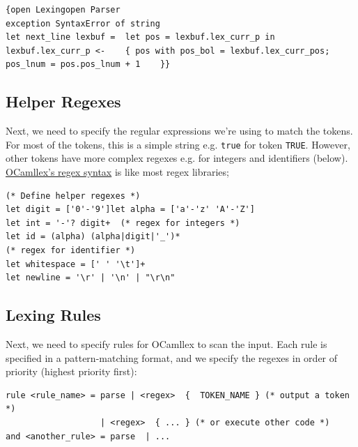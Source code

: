 \begin{lstlisting}[language=caml,caption={{lexer.mll}}]
{open Lexingopen Parser
exception SyntaxError of string
let next_line lexbuf =  let pos = lexbuf.lex_curr_p in  lexbuf.lex_curr_p <-    { pos with pos_bol = lexbuf.lex_curr_pos;               pos_lnum = pos.pos_lnum + 1    }}
\end{lstlisting}

\hypertarget{helper-regexes}{%
\subsection{\texorpdfstring{\protect\hyperlink{helper-regexes}{}Helper
Regexes}{Helper Regexes}}\label{helper-regexes}}

Next, we need to specify the regular expressions we're using to match
the tokens. For most of the tokens, this is a simple string e.g.
\texttt{true} for token \texttt{TRUE}. However, other tokens have more
complex regexes e.g. for integers and identifiers (below).
\href{https://caml.inria.fr/pub/docs/manual-ocaml/lexyacc.html\#ss:ocamllex-regexp}{OCamllex's
regex syntax} is like most regex libraries;
%


\begin{lstlisting}[language=caml,caption={{lexer.mll}}]
(* Define helper regexes *)
let digit = ['0'-'9']let alpha = ['a'-'z' 'A'-'Z']
let int = '-'? digit+  (* regex for integers *)
let id = (alpha) (alpha|digit|'_')* 
(* regex for identifier *)
let whitespace = [' ' '\t']+
let newline = '\r' | '\n' | "\r\n"
\end{lstlisting}

\hypertarget{lexing-rules}{%
\subsection{\texorpdfstring{\protect\hyperlink{lexing-rules}{}Lexing
Rules}{Lexing Rules}}\label{lexing-rules}}

Next, we need to specify rules for OCamllex to scan the input. Each rule
is specified in a pattern-matching format, and we specify the regexes in
order of priority (highest priority first):


\begin{verbatim}
rule <rule_name> = parse | <regex>  {  TOKEN_NAME } (* output a token *)
                   | <regex>  { ... } (* or execute other code *)
and <another_rule> = parse  | ...
\end{verbatim}

